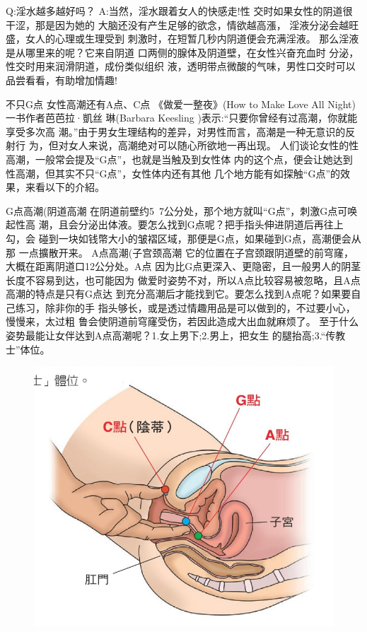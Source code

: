 \documentclass[12pt,UTF8]{ctexbook}
\begin{document}
Q:淫水越多越好吗？
A:当然，淫水跟着女人的快感走!性
交时如果女性的阴道很干涩，那是因为她的
大脑还没有产生足够的欲念，情欲越高漲，
淫液分泌会越旺盛，女人的心理或生理受到
刺激时，在短暂几秒内阴道便会充满淫液。
那么淫液是从哪里来的呢？它来自阴道
口两侧的腺体及阴道壁，在女性兴奋充血时
分泌，性交时用来润滑阴道，成份类似组织
液，透明带点微酸的气味，男性口交时可以
品尝看看，有助增加情趣!

不只G点
女性高潮还有A点、C点
《做爱一整夜》(How to Make Love All Night)一书作者芭芭拉·凱丝
琳(Barbara Keesling )表示:“只要你曾经有过高潮，你就能享受多次高
潮。”由于男女生理结构的差异，对男性而言，高潮是一种无意识的反射行
为，但对女人来说，高潮绝对可以随心所欲地一再出现。
人们谈论女性的性高潮，一般常会提及“G点”，也就是当触及到女性体
内的这个点，便会让她达到性高潮，但其实不只“G点”，女性体内还有其他
几个地方能有如探触“G点”的效果，来看以下的介紹。

G点高潮(阴道高潮
在阴道前壁约5~7公分处，那个地方就叫“G点”，刺激G点可唤起性高
潮，且会分泌出体液。要怎么找到G点呢？把手指头伸进阴道后再往上勾，会
碰到一块如钱幣大小的皱褶区域，那便是G点，如果碰到G点，高潮便会从那
一点擴散开来。
A点高潮(子宫颈高潮
它的位置在子宫颈跟阴道壁的前穹窿，大概在距离阴道口12公分处。A点
因为比G点更深入、更隐密，且一般男人的阴茎长度不容易到达，也可能因为
做爱时姿势不对，所以A点比较容易被忽略，且A点高潮的特点是只有G点达
到充分高潮后才能找到它。要怎么找到A点呢？如果要自己练习，除非你的手
指头够长，或是透过情趣用品是可以做到的，不过要小心，慢慢来，太过粗
鲁会使阴道前穹窿受伤，若因此造成大出血就麻烦了。
至于什么姿势最能让女伴达到A点高潮呢？1.女上男下;2.男上，把女生
的腿抬高;3.“传教士”体位。

\begin{figure}[htbp]
	\centering
	\includegraphics[width=0.7\linewidth]{16}
	\caption{}
	\label{fig:1}
\end{figure}
\end{document}
